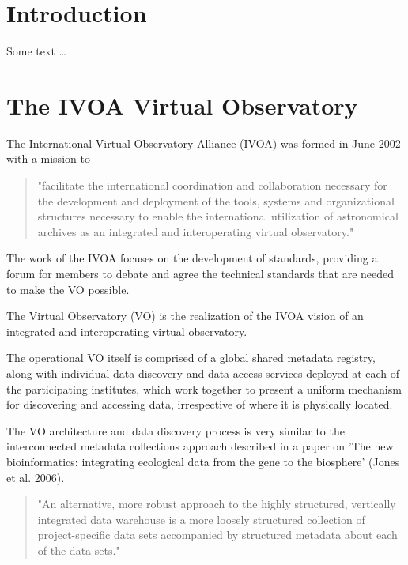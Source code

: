 \documentclass{article}
\begin{document}
\section{Introduction}

Some text \ldots

\section{The IVOA Virtual Observatory}

The International Virtual Observatory Alliance (IVOA)
was formed in June 2002 with a mission to
\begin{quote}
"facilitate the international coordination and collaboration
necessary for the development and deployment of the tools, systems and
organizational structures necessary to enable the international utilization of
astronomical archives as an integrated and interoperating virtual observatory."
\end{quote}

The work of the IVOA focuses on the development of standards, providing a forum
for members to debate and agree the technical standards that are needed to make
the VO possible.

The Virtual Observatory (VO) is the realization of the IVOA vision of an
integrated and interoperating virtual observatory.

The operational VO itself is comprised of a global shared metadata registry,
along with individual data discovery and data access services deployed at each
of the participating institutes, which work together to present a uniform
mechanism for discovering and accessing data, irrespective of where it is
physically located.

The VO architecture and data discovery process is very similar to the
interconnected metadata collections approach described in a paper on 'The new
bioinformatics: integrating ecological data from the gene to the biosphere'
(Jones et al. 2006).

\begin{quote}
"An alternative, more robust approach to the highly structured, vertically integrated
data warehouse is a more loosely structured collection of project-specific data sets
accompanied by structured metadata about each of the data sets."
\end{quote}
\end{document}
